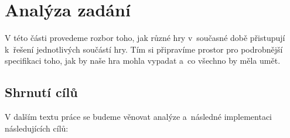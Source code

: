 
\chapter{Analýza zadání}
\label{chap:analyza}

V této části provedeme rozbor toho, jak různé hry v~současné době přistupují k~řešení jednotlivých součástí hry. Tím si připravíme prostor pro podrobnější specifikaci toho, jak by naše hra mohla vypadat a~co všechno by měla umět.







\pagebreak
\section{Shrnutí cílů}

V dalším textu práce se budeme věnovat analýze a~následné implementaci následujících cílů:

